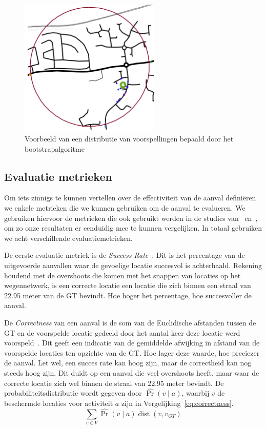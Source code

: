 \begin{figure}[h]
    \centering
    \includegraphics[width=0.6\textwidth]{fig/bootstrapping.png}
    \caption{Voorbeeld van een distributie van voorspellingen bepaald door het bootstrapalgoritme~\cite{Verdonck_2022}}\label{fig:bootstrapping}
\end{figure}

\subsection{Evaluatie metrieken}
Om iets zinnigs te kunnen vertellen over de effectiviteit van de aanval
definiëren we enkele metrieken die we kunnen gebruiken om de aanval te
evalueren. We gebruiken hiervoor de metrieken die ook gebruikt werden in de
studies van~\citeauthor{Dhondt} en~\citeauthor{Verdonck_2022}, om zo onze
resultaten er eenduidig mee te kunnen vergelijken. In totaal gebruiken we acht
verschillende evaluatiemetrieken.

De eerste evaluatie metriek is de \textit{Success Rate}~\cite{Dhondt}. Dit is
het percentage van de uitgevoerde aanvallen waar de gevoelige locatie succesvol
is achterhaald. Rekening houdend met de overshoots die komen met het snappen
van locaties op het wegennetwerk, is een correcte locatie een locatie die zich
binnen een straal van 22.95 meter van de \ac{GT} bevindt. Hoe hoger het
percentage, hoe succesvoller de aanval.

De \textit{Correctness} van een aanval is de som van de Euclidische afstanden
tussen de \ac{GT} en de voorspelde locatie gedeeld door het aantal keer deze
locatie werd voorspeld~\cite{Dhondt, Verdonck_2022}. Dit geeft een indicatie
van de gemiddelde afwijking in afstand van de voorspelde locaties ten opzichte
van de \ac{GT}. Hoe lager deze waarde, hoe preciezer de aanval. Let wel, een
succes rate kan hoog zijn, maar de correctheid kan nog steeds hoog zijn. Dit
duidt op een aanval die veel overshoots heeft, maar waar de correcte locatie
zich wel binnen de straal van 22.95 meter bevindt. De probabiliteitsdistributie
wordt gegeven door $\widehat{\operatorname{Pr}}(v \mid a)$, waarbij $v$ de
beschermde locaties voor activiteit $a$ zijn in
Vergelijking~\ref{eq:correctness}.
\begin{equation}
    \sum_{v \in V} \widehat{\operatorname{Pr}}(v \mid a) \operatorname{dist}\left(v, v_{G T}\right)\label{eq:correctness}
\end{equation}


